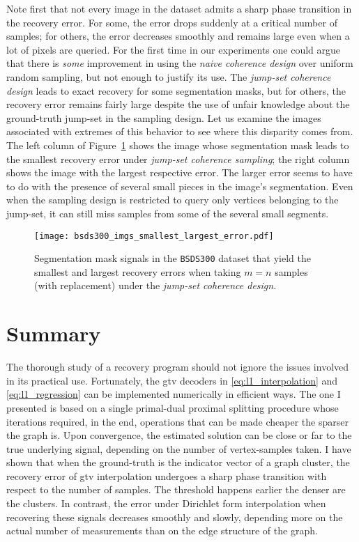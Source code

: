 Note first that not every image in the dataset admits a sharp phase transition in the recovery error. For some, the error drops suddenly at a critical number of samples; for others, the error decreases smoothly and remains large even when a lot of pixels are queried. For the first time in our experiments one could argue that there is \emph{some} improvement in using the \emph{naive coherence design} over uniform random sampling, but not enough to justify its use. The \emph{jump-set coherence design} leads to exact recovery for some segmentation masks, but for others, the recovery error remains fairly large despite the use of unfair knowledge about the ground-truth jump-set in the sampling design. Let us examine the images associated with extremes of this behavior to see where this disparity comes from. The left column of Figure~\ref{fig:bsds300_imgs_smallest_largest_error} shows the image whose segmentation mask leads to the smallest recovery error under \emph{jump-set coherence sampling}; the right column shows the image with the largest respective error. The larger error seems to have to do with the presence of several small pieces in the image's segmentation. Even when the sampling design is restricted to query only vertices belonging to the jump-set, it can still miss samples from some of the several small segments.

\begin{figure}[H]
    \centering
    \texttt{[image: bsds300\_imgs\_smallest\_largest\_error.pdf]}
    \caption[Segmentation masks in \texttt{BSDS300} with the smallest and largest recovery errors]{Segmentation mask signals in the \texttt{BSDS300} dataset that yield the smallest and largest recovery errors when taking $m = n$ samples (with replacement) under the \emph{jump-set coherence design}.}
    \label{fig:bsds300_imgs_smallest_largest_error}
\end{figure}
\clearpage


\section{Summary}

The thorough study of a recovery program should not ignore the issues involved in its practical use. Fortunately, the \acrshort{gtv} decoders in \eqref{eq:l1_interpolation} and \eqref{eq:l1_regression} can be implemented numerically in efficient ways. The one I presented is based on a single primal-dual proximal splitting procedure whose iterations required, in the end, operations that can be made cheaper the sparser the graph is. Upon convergence, the estimated solution can be close or far to the true underlying signal, depending on the number of vertex-samples taken. I have shown that when the ground-truth is the indicator vector of a graph cluster, the recovery error of \acrshort{gtv} interpolation undergoes a sharp phase transition with respect to the number of samples. The threshold happens earlier the denser are the clusters. In contrast, the error under Dirichlet form interpolation when recovering these signals decreases smoothly and slowly, depending more on the actual number of measurements than on the edge structure of the graph.

